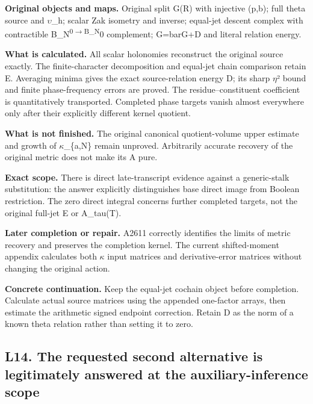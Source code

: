 \documentclass[10pt,a4paper,oneside]{report}
\begin{document}
\textbf{Original objects and maps.} Original split G(R) with injective
(p,b); full theta source and
\allowbreak{}\ensuremath{υ}\allowbreak{}\_h; scalar Zak isometry and
inverse; equal-jet descent complex with contractible
B\_N\textsuperscript{0\allowbreak{}\ensuremath{→}\allowbreak{}B\_N}0
complement; G=barG+D and literal relation energy.

\textbf{What is calculated.} All scalar holonomies reconstruct the
original source exactly. The finite-character decomposition and
equal-jet chain comparison retain E. Averaging minima gives the exact
source-relation energy D; its sharp
\allowbreak{}\ensuremath{η}\allowbreak{}² bound and finite
phase-frequency errors are proved. The residue--constituent coefficient
is quantitatively transported. Completed phase targets vanish almost
everywhere only after their explicitly different kernel quotient.

\textbf{What is not finished.} The original canonical quotient-volume
upper estimate and growth of
\allowbreak{}\ensuremath{κ}\allowbreak{}\_\{a,N\} remain unproved.
Arbitrarily accurate recovery of the original metric does not make its A
pure.

\textbf{Exact scope.} There is direct late-transcript evidence against a
generic-stalk substitution: the answer explicitly distinguishes base
direct image from Boolean restriction. The zero direct integral concerns
further completed targets, not the original full-jet E or A\_tau(T).

\textbf{Later completion or repair.} A2611 correctly identifies the
limits of metric recovery and preserves the completion kernel. The
current shifted-moment appendix calculates both
\allowbreak{}\ensuremath{κ}\allowbreak{} input matrices and
derivative-error matrices without changing the original action.

\textbf{Concrete continuation.} Keep the equal-jet cochain object before
completion. Calculate actual source matrices using the appended
one-factor arrays, then estimate the arithmetic signed endpoint
correction. Retain D as the norm of a known theta relation rather than
setting it to zero.

\subsection{L14. The requested second alternative is legitimately
answered at the auxiliary-inference
scope}\label{l14.-the-requested-second-alternative-is-legitimately-answered-at-the-auxiliary-inference-scope}
\end{document}
